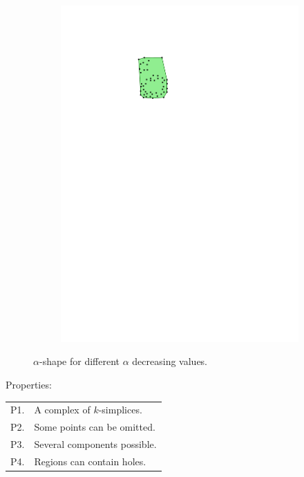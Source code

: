 \begin{figure}
\begin{subfigure}[b]{0.15\linewidth}
    \includegraphics[page=5,width=\textwidth]{figs/alphashape.pdf}
    \caption{}
  \end{subfigure}
  \qquad 
\caption{$\alpha$-shape for different $\alpha$ decreasing values.}
\label{fig:alphashape}
\end{figure}

Properties:
\\
\begin{tabular}{@{}ll@{}}
\toprule
P1. & A complex of $k$-simplices.  \\  
P2. & Some points can be omitted. \\ 
P3. & Several components possible.  \\ 
P4. & Regions can contain holes.  \\  
\bottomrule
\end{tabular}



